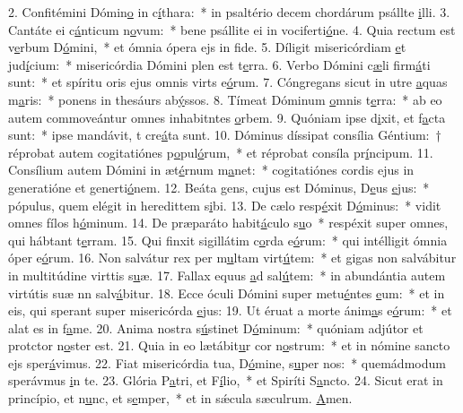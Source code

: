 2. Confitémini Dómin\uline{o} in c\uline{í}thara:~* in psaltério decem chordárum psállte \uline{i}lli.
3. Cantáte ei c\uline{á}nticum n\uline{o}vum:~* bene psállite ei in vociferti\uline{ó}ne.
4. Quia rectum est v\uline{e}rbum D\uline{ó}mini,~* et ómnia ópera ejs in f\uline{i}de.
5. Díligit misericórdiam \uline{e}t jud\uline{í}cium:~* misericórdia Dómini plen est t\uline{e}rra.
6. Verbo Dómini c\uline{æ}li firm\uline{á}ti sunt:~* et spíritu oris ejus omnis virts e\uline{ó}rum.
7. Cóngregans sicut in utre \uline{a}quas m\uline{a}ris:~* ponens in thesáurs ab\uline{ý}ssos.
8. Tímeat Dóminum \uline{o}mnis t\uline{e}rra:~* ab eo autem commoveántur omnes inhabitntes \uline{o}rbem.
9. Quóniam ipse d\uline{i}xit, et f\uline{a}cta sunt:~* ipse mandávit, t cre\uline{á}ta sunt.
10. Dóminus díssipat consília Géntium:~† réprobat autem cogitatiónes p\uline{o}pul\uline{ó}rum,~* et réprobat consíla pr\uline{í}ncipum.
11. Consílium autem Dómini in æt\uline{é}rnum m\uline{a}net:~* cogitatiónes cordis ejus in generatióne et generti\uline{ó}nem.
12. Beáta gens, cujus est Dóminus, D\uline{e}us \uline{e}jus:~* pópulus, quem elégit in heredittem s\uline{i}bi.
13. De cælo resp\uline{é}xit D\uline{ó}minus:~* vidit omnes fílos h\uline{ó}minum.
14. De præparáto habit\uline{á}culo s\uline{u}o~* respéxit super omnes, qui hábtant t\uline{e}rram.
15. Qui finxit sigillátim c\uline{o}rda e\uline{ó}rum:~* qui intélligit ómnia óper e\uline{ó}rum.
16. Non salvátur rex per m\uline{u}ltam virt\uline{ú}tem:~* et gigas non salvábitur in multitúdine virttis s\uline{u}æ.
17. Fallax equus \uline{a}d sal\uline{ú}tem:~* in abundántia autem virtútis suæ nn salv\uline{á}bitur.
18. Ecce óculi Dómini super metu\uline{é}ntes \uline{e}um:~* et in eis, qui sperant super misericórda \uline{e}jus:
19. Ut éruat a morte ánim\uline{a}s e\uline{ó}rum:~* et alat es in f\uline{a}me.
20. Anima nostra s\uline{ú}stinet D\uline{ó}minum:~* quóniam adjútor et protctor n\uline{o}ster est.
21. Quia in eo lætábit\uline{u}r cor n\uline{o}strum:~* et in nómine sancto ejs sper\uline{á}vimus.
22. Fiat misericórdia tua, D\uline{ó}mine, s\uline{u}per nos:~* quemádmodum sperávmus \uline{i}n te.
23. Glória P\uline{a}tri, et F\uline{í}lio,~* et Spiríti S\uline{a}ncto.
24. Sicut erat in princípio, et n\uline{u}nc, et s\uline{e}mper,~* et in sǽcula sæculrum. \uline{A}men.
